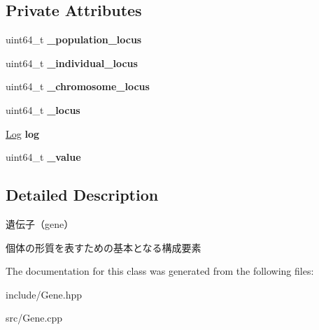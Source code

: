 \subsection*{Private Attributes}
\begin{DoxyCompactItemize}
\item 
\mbox{\label{class_g_a_1_1_gene_a88fb1cc590c80edf5a5713d31d9acdf0}} 
uint64\+\_\+t {\bfseries \+\_\+population\+\_\+locus}
\item 
\mbox{\label{class_g_a_1_1_gene_a1be9bcc3915c9305e3a414a744b97728}} 
uint64\+\_\+t {\bfseries \+\_\+individual\+\_\+locus}
\item 
\mbox{\label{class_g_a_1_1_gene_a17a2a3aedf051115bdaf921c47174890}} 
uint64\+\_\+t {\bfseries \+\_\+chromosome\+\_\+locus}
\item 
\mbox{\label{class_g_a_1_1_gene_ac79e175f79bfe239ed8299feddab5d31}} 
uint64\+\_\+t {\bfseries \+\_\+locus}
\item 
\mbox{\label{class_g_a_1_1_gene_ad182d61f518b20f4e47b739925d62b33}} 
\mbox{\hyperlink{class_g_a_1_1_log}{Log}} {\bfseries log}
\item 
\mbox{\label{class_g_a_1_1_gene_aba9316f4d54088d74647e1c42b50fb2e}} 
uint64\+\_\+t {\bfseries \+\_\+value}
\end{DoxyCompactItemize}


\subsection{Detailed Description}
遺伝子（gene） 

個体の形質を表すための基本となる構成要素 

The documentation for this class was generated from the following files\+:\begin{DoxyCompactItemize}
\item 
include/Gene.\+hpp\item 
src/Gene.\+cpp\end{DoxyCompactItemize}
